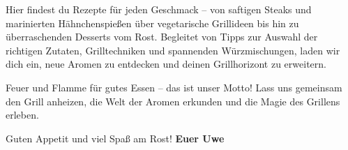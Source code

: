 \documentclass[pdftext, bcor=7mm, ngerman]{scrbook}
\begin{document}
Hier findest du Rezepte für jeden Geschmack – von saftigen Steaks und marinierten Hähnchenspießen über vegetarische Grillideen bis 
hin zu überraschenden Desserts vom Rost. Begleitet von Tipps zur Auswahl der richtigen Zutaten, Grilltechniken und spannenden 
Würzmischungen, laden wir dich ein, neue Aromen zu entdecken und deinen Grillhorizont zu erweitern.

Feuer und Flamme für gutes Essen – das ist unser Motto! Lass uns gemeinsam den Grill anheizen, die Welt der Aromen erkunden und die 
Magie des Grillens erleben.

Guten Appetit und viel Spaß am Rost!
\newline
\textbf{Euer Uwe}

\tableofcontents

\mainmatter
 
\end{document}
